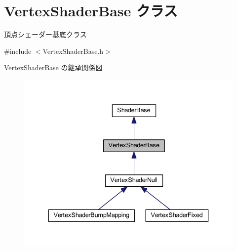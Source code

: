 \hypertarget{class_vertex_shader_base}{}\section{Vertex\+Shader\+Base クラス}
\label{class_vertex_shader_base}


頂点シェーダー基底クラス  




{\ttfamily \#include $<$Vertex\+Shader\+Base.\+h$>$}



Vertex\+Shader\+Base の継承関係図\nopagebreak
\begin{figure}[H]
\begin{center}
\leavevmode
\includegraphics[width=336pt]{class_vertex_shader_base__inherit__graph}
\end{center}
\end{figure}
